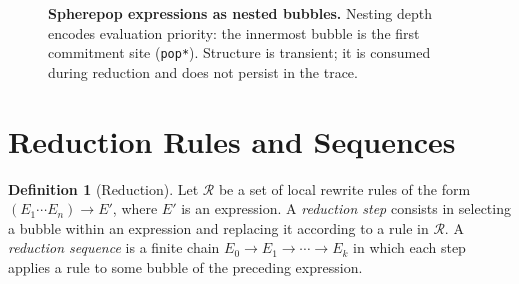 \documentclass[12pt, oneside]{amsbook}
\theoremstyle{plain}
\theoremstyle{definition}
\newtheorem{definition}[theorem]{Definition}
\theoremstyle{remark}
\newcommand{\ruleR}{\mathcal{R}}
\begin{document}
\begin{figure}[htbp]
\centering
{}
\caption{\textbf{Spherepop expressions as nested bubbles.}
  Nesting depth encodes evaluation priority: the innermost bubble
  is the first commitment site (\texttt{pop*}). Structure is transient;
  it is consumed during reduction and does not persist in the trace.}
\label{fig:bubbles}
\end{figure}


\section{Reduction Rules and Sequences}
\label{sec:sp:reduction}

\begin{definition}[Reduction]
\label{def:sp-reduction}
Let $\ruleR$ be a set of local rewrite rules of the form
$(E_1 \cdots E_n) \to E'$,
where $E'$ is an expression. A \emph{reduction step} consists in selecting a
bubble within an expression and replacing it according to a rule in $\ruleR$.
A \emph{reduction sequence} is a finite chain
$E_0 \to E_1 \to \cdots \to E_k$
in which each step applies a rule to some bubble of the preceding expression.
\end{definition}
\end{document}
